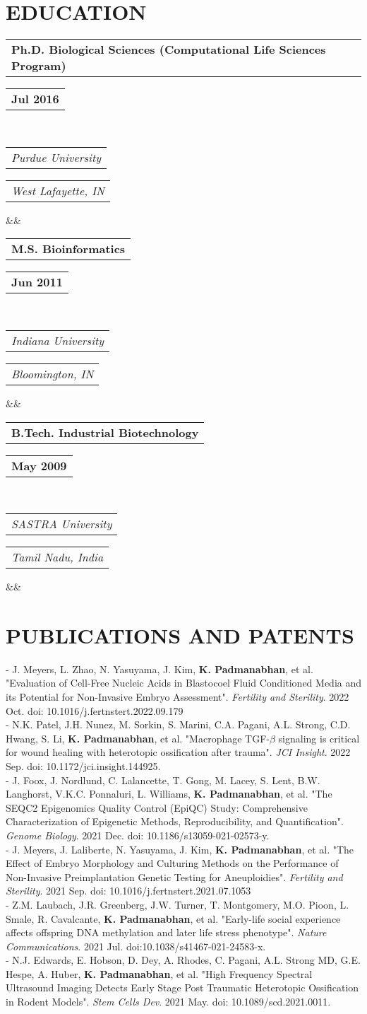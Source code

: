 \documentclass[11pt,letterpaper,sans]{moderncv}        %
\makeatletter
\newcommand*{\customcventry}[7][.25em]{
  \begin{tabular}{@{}l} 
    {\bfseries #4}
  \end{tabular}
  \hfill%
  \begin{tabular}{l@{}}
     {\bfseries #5}
  \end{tabular} \\
  \begin{tabular}{@{}l} 
    {\itshape #3}
  \end{tabular}
  \hfill%
  \begin{tabular}{l@{}}
     {\itshape #2}
  \end{tabular}
  \ifx&#7&%
  \else{\\%
    \begin{minipage}{\maincolumnwidth}%
      \small#7%
    \end{minipage}}\fi%
  \par\addvspace{#1}}
\makeatother
\begin{document}
{\section{EDUCATION}
{\customcventry{West Lafayette, IN}{Purdue University}{Ph.D. Biological Sciences (Computational Life Sciences Program)}{Jul 2016}{}{}}
{\customcventry{Bloomington, IN}{Indiana University}{M.S. Bioinformatics}{Jun 2011}{}{}}
{\customcventry{Tamil Nadu, India}{SASTRA University}{B.Tech. Industrial Biotechnology}{May 2009}{}{}}

\section{PUBLICATIONS AND PATENTS}
\begin{minipage}{\maincolumnwidth}%
	\small{
	- J. Meyers, L. Zhao, N. Yasuyama, J. Kim, \textbf{K. Padmanabhan}, et al. "Evaluation of Cell-Free Nucleic Acids in Blastocoel Fluid Conditioned Media and its Potential for Non-Invasive Embryo Assessment". \textit{Fertility and Sterility}. 2022 Oct. doi: 10.1016/j.fertnstert.2022.09.179\\
	- N.K. Patel, J.H. Nunez, M. Sorkin, S. Marini, C.A. Pagani, A.L. Strong, C.D. Hwang, S. Li, \textbf{K. Padmanabhan}, et al. "Macrophage TGF-$\beta$ signaling is critical for wound healing with heterotopic ossification after trauma".  \textit{JCI Insight}. 2022 Sep. doi: 10.1172/jci.insight.144925.\\
	- J. Foox, J. Nordlund, C. Lalancette, T. Gong, M. Lacey, S. Lent, B.W. Langhorst, V.K.C. Ponnaluri, L. Williams, \textbf{K. Padmanabhan}, et al. "The SEQC2 Epigenomics Quality Control (EpiQC) Study: Comprehensive Characterization of Epigenetic Methods, Reproducibility, and Quantification".  \textit{Genome Biology}. 2021 Dec. doi: 10.1186/s13059-021-02573-y.\\
	- J. Meyers, J. Laliberte, N. Yasuyama, J. Kim, \textbf{K. Padmanabhan}, et al. "The Effect of Embryo Morphology and Culturing Methods on the Performance of Non-Invasive Preimplantation Genetic Testing for Aneuploidies". \textit{Fertility and Sterility}. 2021 Sep. doi: 10.1016/j.fertnstert.2021.07.1053 \\
	- Z.M. Laubach, J.R. Greenberg, J.W. Turner, T. Montgomery, M.O. Pioon, L. Smale, R. Cavalcante, \textbf{K. Padmanabhan}, et al. "Early-life social experience affects offspring DNA methylation and later life stress phenotype". \textit{Nature Communications}. 2021 Jul. doi:10.1038/s41467-021-24583-x.\\
	- N.J. Edwards, E. Hobson, D. Dey, A. Rhodes, C. Pagani, A.L. Strong MD, G.E. Hespe, A. Huber, \textbf{K. Padmanabhan}, et al. "High Frequency Spectral Ultrasound Imaging Detects Early Stage Post Traumatic Heterotopic Ossification in Rodent Models". \textit{Stem Cells Dev}. 2021 May. doi: 10.1089/scd.2021.0011.\\
}
\end{minipage}}
\end{document}
